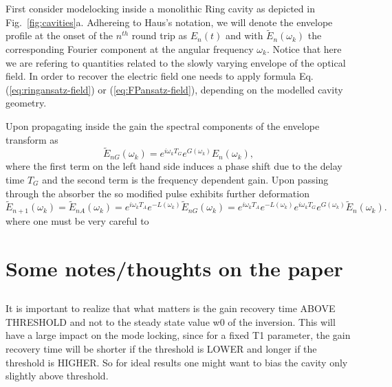 \documentclass[preprint,secnumarabic,amssymb, nobibnotes, aip, prd]{revtex4-1}
\begin{document}
First consider modelocking inside a monolithic Ring cavity as depicted in Fig.~\ref{fig:cavities}a.  Adhereing to Haus's notation, we will denote the envelope profile at the onset of the $n^{th}$ round trip as $E_n(t)$ and with $\tilde E_n(\omega_k) $ the corresponding Fourier component at the angular frequency $\omega_k$.  Notice that here we are refering to quantities related to the slowly varying envelope of the optical field. In order to recover the electric field one needs to apply formula Eq. (\ref{eq:ringansatz-field}) or (\ref{eq:FPansatz-field}), depending on the modelled cavity geometry. 

Upon propagating inside the gain the spectral components of the envelope transform as
\begin{equation}
\label{eq:gainprop}
\tilde E_{nG}(\omega_k) = e^{i\omega_k T_G}e^{G(\omega_k)}E_n(\omega_k), 
\end{equation}
where the first term on the left hand side induces a phase shift due to the delay time $T_G$ and the second term is the frequency dependent gain. Upon passing through the absorber the so modified pulse exhibits further deformation 
\begin{equation}
\label{eq:gainprop}
\tilde E_{n+1}(\omega_k) = \tilde E_{nA}(\omega_k) = e^{i\omega_k T_A}e^{-L(\omega_k)}\tilde E_{nG}(\omega_k) =e^{i\omega_k T_A}e^{-L(\omega_k)} e^{i\omega_k T_G}e^{G(\omega_k)}\tilde E_n(\omega_k). 
\end{equation}
where one must be very careful to 


\section{Some notes/thoughts on the paper}
\subsection{}
	It is important to realize that what matters is the gain recovery time ABOVE THRESHOLD and not to the steady state value w0 of the inversion. This will have a large impact on the mode locking, since for a fixed T1 parameter, the gain recovery time will be shorter if the threshold is LOWER and longer if the threshold is HIGHER. So for ideal results one might want to bias the cavity only slightly above threshold.
\end{document}
